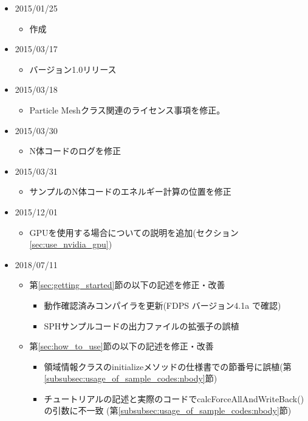 \begin{itemize}
\item 2015/01/25
  \begin{itemize}
  \item 作成
  \end{itemize}
\item 2015/03/17
  \begin{itemize}
  \item バージョン1.0リリース
  \end{itemize}
\item 2015/03/18
  \begin{itemize}
  \item Particle Meshクラス関連のライセンス事項を修正。
  \end{itemize}
\item 2015/03/30
  \begin{itemize}
  \item N体コードのログを修正
  \end{itemize}
\item 2015/03/31
  \begin{itemize}
  \item サンプルのN体コードのエネルギー計算の位置を修正
  \end{itemize}
\item 2015/12/01
  \begin{itemize}
  \item GPUを使用する場合についての説明を追加(セクション\ref{sec:use_nvidia_gpu})
  \end{itemize}
\item 2018/07/11
  \begin{itemize}
  \item 第\ref{sec:getting_started}節の以下の記述を修正・改善
    \begin{itemize}
    \item 動作確認済みコンパイラを更新(FDPS バージョン4.1a で確認)
    \item SPHサンプルコードの出力ファイルの拡張子の誤植
    \end{itemize}
  \item 第\ref{sec:how_to_use}節の以下の記述を修正・改善
    \begin{itemize}
    \item 領域情報クラスのinitializeメソッドの仕様書での節番号に誤植(第\ref{subsubsec:usage_of_sample_codes:nbody}節)
    \item チュートリアルの記述と実際のコードでcalcForceAllAndWriteBack()の引数に不一致 (第\ref{subsubsec:usage_of_sample_codes:nbody}節)

\end{itemize}
\end{itemize}
\end{itemize}
